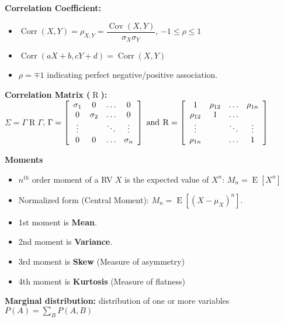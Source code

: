 \documentclass{../cheat}
\begin{document}
\begin{multicols}{3}
			\textbf{Correlation Coefficient:}
	\begin{itemize}[nolistsep, leftmargin=1em]
		\item $\operatorname{Corr}(X,Y)=\rho_{X,Y}=\dfrac{\operatorname{Cov}(X,Y)}{\sigma_X \sigma_Y}$, $-1\leq \rho \leq1$
		\item $\operatorname{Corr}(a X + b, cY + d) = \operatorname{Corr}(X,Y)$
		\item $\rho=\mp1$ indicating perfect negative/positive association.
	\end{itemize}
	
	\textbf{Correlation Matrix ($\operatorname{R}$):}\\
	$\Sigma=\Gamma \operatorname{R} \Gamma$, 
	$\Gamma=\left[\begin{array}{*{4}c}
		\sigma_1 & 0 & \ldots & 0\\
		0 & \sigma_2 & \ldots & 0\\
		\vdots & & \ddots & \vdots\\
		0 & 0 & \ldots & \sigma_n\\
	\end{array}\right] \; \text{and} \:
	\operatorname{R}=\left[\begin{array}{*{4}c}
		1 & \rho_{12} & \ldots & \rho_{1n}\\
		\rho_{12} & 1 & \ldots & \\
		\vdots & & \ddots & \vdots\\
		\rho_{1n} &  & \ldots & 1\\
	\end{array}\right]$	

	\textbf{Moments}
	\begin{itemize}[nolistsep, leftmargin=1em]
		\item $n^{th}$ order moment of a RV $X$ is the expected value of $X^n$: $M_n=\operatorname{E}[X^n]$
		\item Normalized form (Central Moment): $M_n=\operatorname{E}[(X-\mu_X)^n]$.
		\item 1st moment is \textbf{Mean}.
		\item 2nd moment is \textbf{Variance}.
		\item 3rd moment is \textbf{Skew} (Measure of asymmetry)
		\item 4th moment is \textbf{Kurtosis} (Measure of flatness)
	\end{itemize}
	
	\textbf{Marginal distribution:} distribution of one or more variables $P(A)=\sum_B P(A,B)$
	

\end{multicols}
\end{document}
